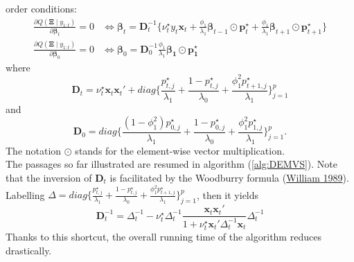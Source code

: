 \documentclass[
  12pt,
]{book}
\theoremstyle{break}
\theoremstyle{nonumberplain}
\begin{document}
order conditions: \begin{align*}
\frac{\partial Q(\boldsymbol{\Xi} \mid y_{1:t})}{\partial \boldsymbol{\beta}_{t}} = 0 & \iff \boldsymbol{\beta}_{t} = \boldsymbol{D}_{t}^{-1}\bigg\{\nu_{t}^{\star}y_{t}\boldsymbol{x}_{t}+\frac{\phi_1}{\lambda_1}\boldsymbol{\beta}_{t-1}\odot\boldsymbol{p}^{\star}_{t}+\frac{\phi_1}{\lambda_{1}}\boldsymbol{\beta}_{t+1}\odot\boldsymbol{p}^{\star}_{t+1}\bigg\}\\
\frac{\partial Q(\boldsymbol{\Xi} \mid y_{1:t})}{\partial \boldsymbol{\beta}_{0}} = 0 & \iff
\boldsymbol{\beta}_{0}=\boldsymbol{D}_{0}^{-1}\frac{\phi_1}{\lambda_1}\boldsymbol{\beta_1}\odot\boldsymbol{p_{1}^{\star}}
\end{align*} where \[
\boldsymbol{D}_t=\nu_t^{\star}\boldsymbol{x}_{t}\boldsymbol{x}_{t}'+diag\bigg\{\frac{p^{\star}_{t,j}}{\lambda_1}+\frac{1-p^{\star}_{t,j}}{\lambda_{0}}+\frac{\phi^{2}_{1}p^{\star}_{t+1,j}}{\lambda_{1}}\bigg\}_{j=1}^{p}
\] and \[
\boldsymbol{D}_0=diag\bigg\{\frac{(1-\phi^2_1)p^{\star}_{0,j}}{\lambda_1}+\frac{1-p^{\star}_{0,j}}{\lambda_0}+\frac{\phi^{2}_1 p^{\star}_{1,j}}{\lambda_1}\bigg\}_{j=1}^{p}.
\] The notation \(\odot\) stands for the element-wise vector
multiplication.\\
The passages so far illustrated are resumed in algorithm
(\ref{alg:DEMVS}). Note that the inversion of \(\boldsymbol{D}_{t}\) is
facilitated by the Woodburry formula
(\protect\hyperlink{ref-Woodburry}{William 1989}).\\
Labelling
\(\Delta = diag\bigg\{\frac{p^{\star}_{t,j}}{\lambda_1}+\frac{1-p^{\star}_{t,j}}{\lambda_{0}}+\frac{\phi^{2}_{1}p^{\star}_{t+1,j}}{\lambda_{1}}\bigg\}_{j=1}^{p}\),
then it yields \[
\boldsymbol{D}^{-1}_{t}=\Delta^{-1}_{t}-\nu_{t}^{\star}\Delta^{-1}_{t}\frac{\boldsymbol{x}_{t}\boldsymbol{x}_{t}'}{1+\nu_{t}^{\star}\boldsymbol{x}_{t}'\Delta^{-1}_{t}\boldsymbol{x}_{t}}\Delta_{t}^{-1}
\] Thanks to this shortcut, the overall running time of the algorithm
reduces drastically.
\end{document}
